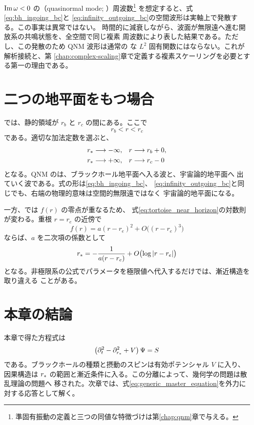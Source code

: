 $\operatorname{Im}\omega<0$ の（quasinormal mode; ）周波数\footnote{%
準固有振動の定義と三つの同値な特徴づけは第\ref{chap:qnm}章で与える。}
を想定すると、式\eqref{eq:bh_ingoing_bc}と
\eqref{eq:infinity_outgoing_bc}の空間波形は実軸上で発散する。この事実は異常ではない。
時間的に減衰しながら、波面が無限遠へ進む開放系の共鳴状態を、全空間で同じ複素
周波数により表した結果である。ただし、この発散のため QNM 波形は通常の
な $L^2$ 固有関数にはならない。これが解析接続と、第
\ref{chap:complex-scaling}章で定義する複素スケーリングを必要とする第一の理由である。

\section{二つの地平面をもつ場合}

では、静的領域が $r_b$ と
 $r_c$ の間にある。ここで
\begin{equation}
r_b<r<r_c
\end{equation}
である。適切な加法定数を選ぶと、
\begin{align}
r_*&\longrightarrow-\infty,
&&r\longrightarrow r_b+0,
\\
r_*&\longrightarrow+\infty,
&&r\longrightarrow r_c-0
\end{align}
となる。QNM のは、ブラックホール地平面へ入る波と、宇宙論的地平面へ
出ていく波である。式の形は\eqref{eq:bh_ingoing_bc}、
\eqref{eq:infinity_outgoing_bc}と同じでも、右端の物理的意味は空間的無限遠ではなく
宇宙論的地平面になる。

一方、では $f(r)$ の零点が重なるため、
式\eqref{eq:tortoise_near_horizon}の対数則が変わる。重根 $r=r_e$ の近傍で
\begin{equation}
f(r)
=
a(r-r_e)^2
+O\bigl((r-r_e)^3\bigr)
\end{equation}
ならば、$a$ を二次項の係数として
\begin{equation}
r_*
=
-\frac{1}{a(r-r_e)}
+O\bigl(\log|r-r_e|\bigr)
\end{equation}
となる。非極限系の公式でパラメータを極限値へ代入するだけでは、漸近構造を取り違える
ことがある。

\section{本章の結論}

本章で得た方程式は
\begin{equation}
\left(
\partial_t^2
-\partial_{r_*}^2
+V
\right)\Psi
=
S
\label{eq:generic_master_equation}
\end{equation}
である。ブラックホールの種類と摂動のスピンは有効ポテンシャル $V$ に入り、因果構造は
$r_*$ の範囲と漸近条件に入る。この分離によって、幾何学の問題は散乱理論の問題へ
移された。次章では、式\eqref{eq:generic_master_equation}を外力に対する応答として解く。

